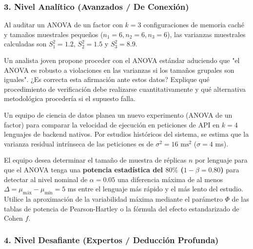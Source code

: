 \subsubsection*{3. Nivel Analítico (Avanzados / De Conexión)}

\begin{problema}
	\label{prob:verificacion_supuestos_anova}
	Al auditar un ANOVA de un factor con $k = 3$ configuraciones de memoria caché y tamaños muestrales pequeños ($n_1=6, n_2=6, n_3=6$), las varianzas muestrales calculadas son $S_1^2 = 1.2$, $S_2^2 = 1.5$ y $S_3^2 = 8.9$.
	
	Un analista joven propone proceder con el ANOVA estándar aduciendo que "el ANOVA es robusto a violaciones en las varianzas si los tamaños grupales son iguales". ¿Es correcta esta afirmación ante estos datos? Explique qué procedimiento de verificación debe realizarse cuantitativamente y qué alternativa metodológica procedería si el supuesto falla.
\end{problema}

\begin{problema}
	\label{prob:potencia_tamano_anova}
	Un equipo de ciencia de datos planea un nuevo experimento (ANOVA de un factor) para comparar la velocidad de ejecución en peticiones de API en $k = 4$ lenguajes de backend nativos. Por estudios históricos del sistema, se estima que la varianza residual intrínseca de las peticiones es de $\sigma^2 = 16$ $\text{ms}^2$ ($\sigma = 4$ ms).
	
	El equipo desea determinar el tamaño de muestra de réplicas $n$ por lenguaje para que el ANOVA tenga una \textbf{potencia estadística del $80\%$ ($1 - \beta = 0.80$)} para detectar al nivel nominal de $\alpha = 0.05$ una diferencia máxima de al menos $\Delta = \mu_{\text{máx}} - \mu_{\text{mín}} = 5$ ms entre el lenguaje más rápido y el más lento del estudio. Utilice la aproximación de la variabilidad máxima mediante el parámetro $\Phi$ de las tablas de potencia de Pearson-Hartley o la fórmula del efecto estandarizado de Cohen $f$.
\end{problema}

\subsubsection*{4. Nivel Desafiante (Expertos / Deducción Profunda)}

